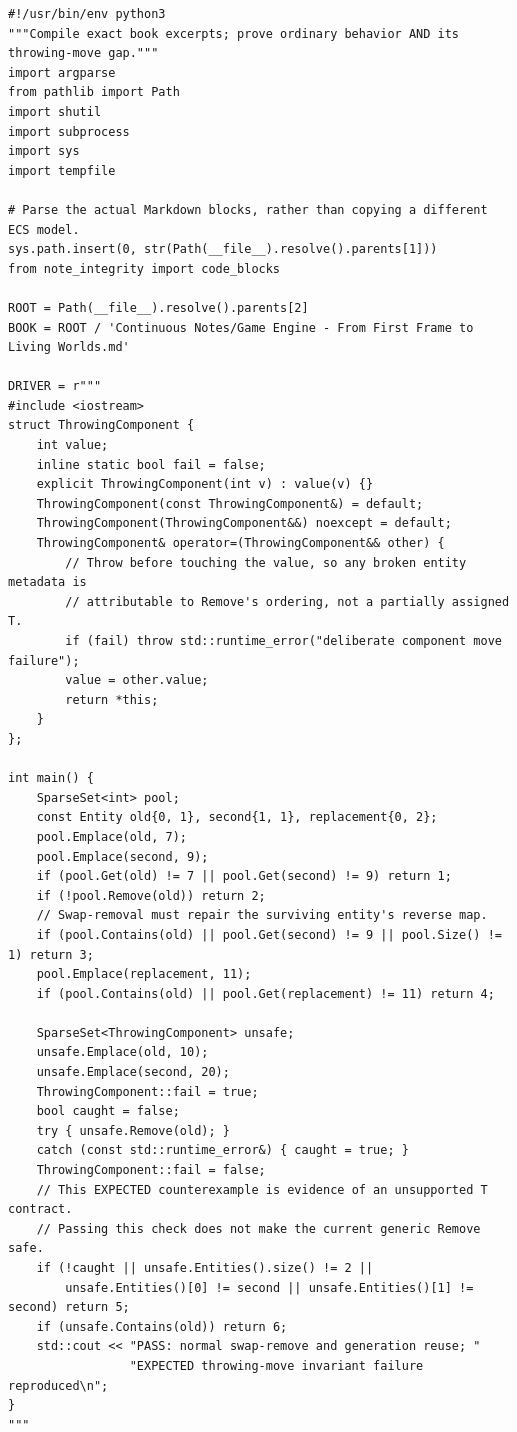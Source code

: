 \begin{verbatim}
#!/usr/bin/env python3
"""Compile exact book excerpts; prove ordinary behavior AND its throwing-move gap."""
import argparse
from pathlib import Path
import shutil
import subprocess
import sys
import tempfile

# Parse the actual Markdown blocks, rather than copying a different ECS model.
sys.path.insert(0, str(Path(__file__).resolve().parents[1]))
from note_integrity import code_blocks

ROOT = Path(__file__).resolve().parents[2]
BOOK = ROOT / 'Continuous Notes/Game Engine - From First Frame to Living Worlds.md'

DRIVER = r"""
#include <iostream>
struct ThrowingComponent {
    int value;
    inline static bool fail = false;
    explicit ThrowingComponent(int v) : value(v) {}
    ThrowingComponent(const ThrowingComponent&) = default;
    ThrowingComponent(ThrowingComponent&&) noexcept = default;
    ThrowingComponent& operator=(ThrowingComponent&& other) {
        // Throw before touching the value, so any broken entity metadata is
        // attributable to Remove's ordering, not a partially assigned T.
        if (fail) throw std::runtime_error("deliberate component move failure");
        value = other.value;
        return *this;
    }
};

int main() {
    SparseSet<int> pool;
    const Entity old{0, 1}, second{1, 1}, replacement{0, 2};
    pool.Emplace(old, 7);
    pool.Emplace(second, 9);
    if (pool.Get(old) != 7 || pool.Get(second) != 9) return 1;
    if (!pool.Remove(old)) return 2;
    // Swap-removal must repair the surviving entity's reverse map.
    if (pool.Contains(old) || pool.Get(second) != 9 || pool.Size() != 1) return 3;
    pool.Emplace(replacement, 11);
    if (pool.Contains(old) || pool.Get(replacement) != 11) return 4;

    SparseSet<ThrowingComponent> unsafe;
    unsafe.Emplace(old, 10);
    unsafe.Emplace(second, 20);
    ThrowingComponent::fail = true;
    bool caught = false;
    try { unsafe.Remove(old); }
    catch (const std::runtime_error&) { caught = true; }
    ThrowingComponent::fail = false;
    // This EXPECTED counterexample is evidence of an unsupported T contract.
    // Passing this check does not make the current generic Remove safe.
    if (!caught || unsafe.Entities().size() != 2 ||
        unsafe.Entities()[0] != second || unsafe.Entities()[1] != second) return 5;
    if (unsafe.Contains(old)) return 6;
    std::cout << "PASS: normal swap-remove and generation reuse; "
                 "EXPECTED throwing-move invariant failure reproduced\n";
}
"""



\end{verbatim}
